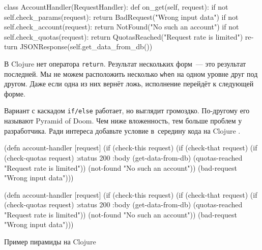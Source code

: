\else

\begin{english}
  \begin{python}
class AccountHandler(RequestHandler):
  def on_get(self, request):
    if not self.check_params(request):
      return BadRequest("Wrong input data")
    if not self.check_account(request):
      return NotFound("No such an account")
    if not self.check_quotas(request):
      return QuotasReached("Request rate is limited")
    return JSONResponse(self.get_data_from_db())
  \end{python}
\end{english}

\fi

В Clojure нет оператора \verb|return|. Результат нескольких форм~--- это результат
последней. Мы не можем расположить несколько \verb|when| на одном уровне друг
под другом. Даже если одна из них вернёт ложь, исполнение перейдёт к следующей
форме.


Вариант с каскадом \verb|if/else| работает, но выглядит громоздко. По-другому
его называют Pyramid of Doom. Чем ниже вложенность, тем больше проблем у
разработчика. Ради интереса добавьте условие в~середину кода на Clojure
.

\begin{listing}[ht!]

\ifx\DEVICETYPE\MOBILE

\begin{english}
  \begin{clojure}
(defn account-handler [request]
  (if (check-this request)
    (if (check-that request)
      (if (check-quotas request)
        {:status 200
         :body (get-data-from-db)}
        (quotas-reached
          "Request rate is limited"))
      (not-found "No such an account"))
    (bad-request "Wrong input data")))
  \end{clojure}
\end{english}

\else

\begin{english}
  \begin{clojure}
(defn account-handler [request]
  (if (check-this request)
    (if (check-that request)
      (if (check-quotas request)
        {:status 200
         :body (get-data-from-db)}
        (quotas-reached "Request rate is limited"))
      (not-found "No such an account"))
    (bad-request "Wrong input data")))
  \end{clojure}
\end{english}

\fi

\caption{Пример пирамиды на Clojure}
\label{fig:clj-pyramid}

\end{listing}

